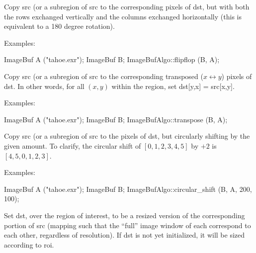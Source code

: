  
Copy {\cf src} (or a subregion of {\cf src} to the corresponding pixels
of {\cf dst}, but with both the rows exchanged vertically and the
columns exchanged horizontally (this is equivalent to a 180 degree rotation).

\smallskip
\noindent Examples:
\begin{code}
    ImageBuf A ("tahoe.exr");
    ImageBuf B;
    ImageBufAlgo::flipflop (B, A);
\end{code}
\apiend


 
Copy {\cf src} (or a subregion of {\cf src} to the corresponding 
transposed ($x \leftrightarrow y$) pixels
of {\cf dst}.  In other words, for all $(x,y)$ within the region,
set {\cf dst[y,x] = src[x,y]}.

\smallskip
\noindent Examples:
\begin{code}
    ImageBuf A ("tahoe.exr");
    ImageBuf B;
    ImageBufAlgo::transpose (B, A);
\end{code}
\apiend


 

Copy {\cf src} (or a subregion of {\cf src} to the pixels of {\cf dst},
but circularly shifting by the given amount.  To clarify, the circular
shift of $[0,1,2,3,4,5]$ by $+2$ is $[4,5,0,1,2,3]$.

\smallskip
\noindent Examples:
\begin{code}
    ImageBuf A ("tahoe.exr");
    ImageBuf B;
    ImageBufAlgo::circular_shift (B, A, 200, 100);
\end{code}
\apiend


 
Set {\cf dst}, over the region of interest, to be a resized version of the
corresponding portion of {\cf src} (mapping such that the ``full'' image
window of each correspond to each other, regardless of resolution).  If
{\cf dst} is not yet initialized, it will be sized according to {\cf roi}.

